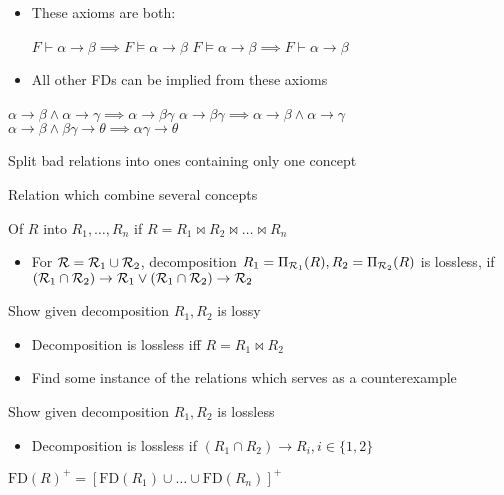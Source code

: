\begin{itemize}
\begin{itemize}
            \item These axioms are both:
                \begin{itemize}
                     $F \vdash \alpha \to \beta \implies F \models \alpha \to \beta$
                     $F \models \alpha \to \beta \implies F \vdash \alpha \to \beta$
                \end{itemize}
            \item All other FDs can be implied from these axioms
        \end{itemize}
        \begin{itemize}
             $\alpha \to \beta \wedge \alpha \to \gamma \implies \alpha \to \beta \gamma$
             $\alpha \to \beta \gamma \implies \alpha \to \beta \wedge \alpha \to \gamma$
             $\alpha \to \beta \wedge \beta \gamma \to \theta \implies \alpha \gamma \to \theta$
        \end{itemize}
        \begin{itemize}
             Split bad relations into ones containing only one concept
                \begin{itemize}
                     Relation which combine several concepts
                \end{itemize}
             Of $R$ into $R_1, \dots, R_n$ if $R = R_1 \bowtie R_2 \bowtie \dots \bowtie R_n$
                \begin{itemize}
                    \item For $\mathcal{R} = \mathcal{R}_1 \cup \mathcal{R}_2$, decomposition $R_1 = \Pi_{\mathcal{R}_1}(R), R_2 = \Pi_{\mathcal{R}_2}(R)$ is lossless, if $(\mathcal{R}_1 \cap \mathcal{R}_2) \to \mathcal{R}_1 \vee (\mathcal{R}_1 \cap \mathcal{R}_2) \to \mathcal{R}_2$
                \end{itemize}
             Show given decomposition $R_1, R_2$ is lossy
                \begin{itemize}
                    \item Decomposition is lossless iff $R = R_1 \bowtie R_2$
                    \item Find some instance of the relations which serves as a counterexample
                \end{itemize}
             Show given decomposition $R_1, R_2$ is lossless
                \begin{itemize}
                    \item Decomposition is lossless if $(R_1 \cap R_2) \to R_i, i \in \{1, 2\}$
                \end{itemize}
             $\text{FD}(R)^+ = [\text{FD}(R_1) \cup \dots \cup \text{FD}(R_n)]^+$
        \end{itemize}
\end{itemize}
